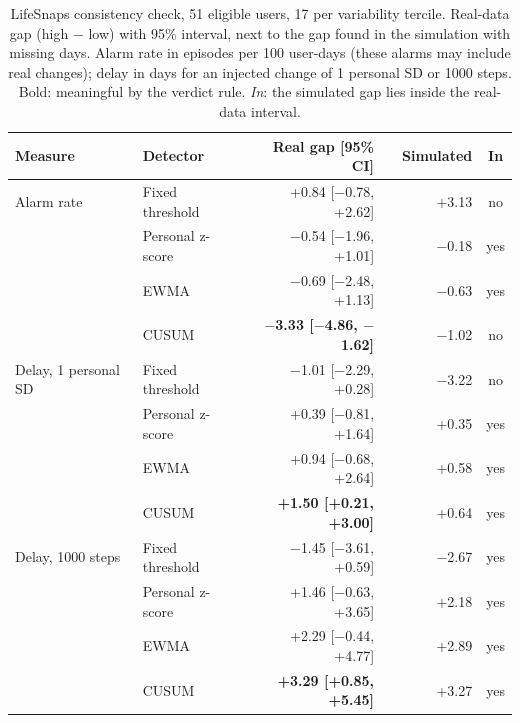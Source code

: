 \begin{table}[t]
\centering
\small
\caption{LifeSnaps consistency check, 51 eligible users, 17 per variability tercile. Real-data gap (high $-$ low) with 95\% interval, next to the gap found in the simulation with missing days. Alarm rate in episodes per 100 user-days (these alarms may include real changes); delay in days for an injected change of 1 personal SD or 1000 steps. Bold: meaningful by the verdict rule. \emph{In}: the simulated gap lies inside the real-data interval.}
\label{tab:ls}
\begin{tabular}{@{}llrlrc@{}}
\toprule
Measure & Detector & Real gap [95\% CI] & & Simulated & In \\
\midrule
Alarm rate & Fixed threshold & +0.84 [$-$0.78, +2.62] & & +3.13 & no \\
 & Personal z-score & $-$0.54 [$-$1.96, +1.01] & & $-$0.18 & yes \\
 & EWMA & $-$0.69 [$-$2.48, +1.13] & & $-$0.63 & yes \\
 & CUSUM & \textbf{$-$3.33 [$-$4.86, $-$1.62]} & & $-$1.02 & no \\
\addlinespace
Delay, 1 personal SD & Fixed threshold & $-$1.01 [$-$2.29, +0.28] & & $-$3.22 & no \\
 & Personal z-score & +0.39 [$-$0.81, +1.64] & & +0.35 & yes \\
 & EWMA & +0.94 [$-$0.68, +2.64] & & +0.58 & yes \\
 & CUSUM & \textbf{+1.50 [+0.21, +3.00]} & & +0.64 & yes \\
\addlinespace
Delay, 1000 steps & Fixed threshold & $-$1.45 [$-$3.61, +0.59] & & $-$2.67 & yes \\
 & Personal z-score & +1.46 [$-$0.63, +3.65] & & +2.18 & yes \\
 & EWMA & +2.29 [$-$0.44, +4.77] & & +2.89 & yes \\
 & CUSUM & \textbf{+3.29 [+0.85, +5.45]} & & +3.27 & yes \\
\bottomrule
\end{tabular}
\end{table}
